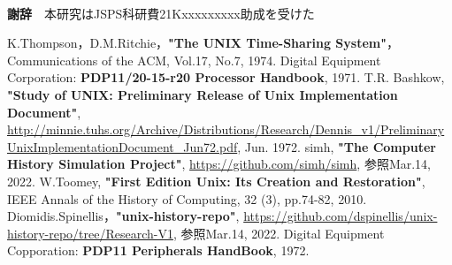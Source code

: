 \newpage
~\\
\noindent\textbf{謝辞}~~本研究はJSPS科研費21Kxxxxxxxxx助成を受けた
\begin{thebibliography}{99}
\small
\setlength\itemsep{-0.5zh}%
 K.Thompson，D.M.Ritchie，\textbf{"The UNIX Time-Sharing System"}，Communications of the ACM, Vol.17, No.7, 1974.
 Digital Equipment Corporation: \textbf{PDP11/20-15-r20 Processor Handbook}, 1971.
 T.R. Bashkow, \textbf{"Study of UNIX: Preliminary Release of Unix Implementation Document"}, \url{ http://minnie.tuhs.org/Archive/Distributions/Research/Dennis_v1/PreliminaryUnixImplementationDocument_Jun72.pdf}, Jun. 1972.
 simh, \textbf{"The Computer History Simulation Project"}, \url{https://github.com/simh/simh}, 参照Mar.14, 2022.
 W.Toomey, \textbf{"First Edition Unix: Its Creation and Restoration"}, IEEE Annals of the History of Computing, 32 (3), pp.74-82, 2010.
 Diomidis.Spinellis，\textbf{"unix-history-repo"},  \url{https://github.com/dspinellis/unix-history-repo/tree/Research-V1}, 参照Mar.14, 2022.
 Digital Equipment Copporation: \textbf{PDP11 Peripherals HandBook}, 1972.
\end{thebibliography}

 
